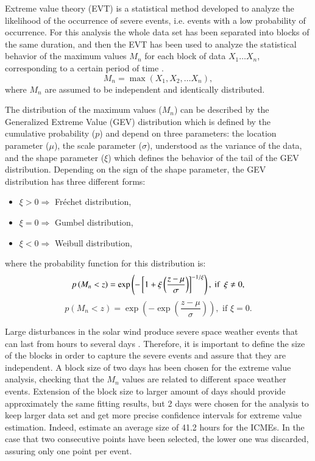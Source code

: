 \documentclass{article}
\begin{document}
Extreme value theory (EVT) is a statistical method developed to analyze the likelihood of the occurrence of severe events, i.e. events with a low probability of occurrence. For this analysis the whole data set has been separated into blocks of the same duration, and then the EVT has been used to analyze the statistical behavior of the maximum values $M_{n}$ for each block of data $X_{1}\dots X_{n}$, corresponding to a certain period of time \cite{Coles_2001_Extreme_Book}.
\begin{equation}
    M_{n}=\max \left(X_{1},X_{2},\dots X_{n} \right),
\end{equation}
where $M_{n}$ are assumed to be independent and identically distributed. 

The distribution of the maximum values ($M_{n}$) can be described by the Generalized Extreme Value (GEV) distribution which is defined by the cumulative probability ($p$) and depend on three parameters: the location parameter ($\mu$), the scale parameter ($\sigma$), understood as the variance of the data, and the shape parameter ($\xi$) which defines the behavior of the tail of the GEV distribution. Depending on the sign of the shape parameter, the GEV distribution has three different forms:

\renewcommand{\labelitemi}{\textbullet}
\begin{itemize}
\item $\xi>0 \Rightarrow$ Fréchet distribution,
\item $\xi=0 \Rightarrow$ Gumbel distribution,
\item $\xi<0 \Rightarrow$ Weibull distribution,
\end{itemize}
where the probability function for this distribution is: 
\begin{equation}
    p\left(M_n <z \right)=\exp\left(-\left[1+\xi \left(\frac{z-\mu}{\sigma}\right)\right]^{-1/\xi}\right),\mbox{ if \space} \xi \neq 0,
    \label{eq:GEV}
\end{equation}
\begin{equation}
    p\left(M_n < z\right)=\exp\left(-\exp \left(\frac{z-\mu}{\sigma}\right)\right), \mbox{ if } \xi = 0.
    \label{eq:GEV2}
\end{equation}

Large disturbances in the solar wind produce severe space weather events that can last from hours to several days \cite{Gopalswamy_2016_CMEs}. Therefore, it is important to define the size of the blocks in order to capture the severe events and assure that they are independent.
A block size of two days has been chosen for the extreme value analysis, checking that the $M_n$ values are related to different space weather events. Extension of the block size to larger amount of days should provide approximately the same fitting results, but 2 days were chosen for the analysis to keep larger data set and get more precise confidence intervals for extreme value estimation. Indeed, \cite{Zhang_2008_ICME_size} estimate an average size of 41.2 hours for the ICMEs. In the case that two consecutive points have been selected, the lower one was discarded, assuring only one point per event.
\end{document}
